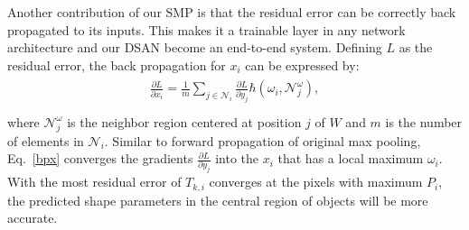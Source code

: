 Another contribution of our SMP is that the residual error can be correctly back propagated to its inputs.
This makes it a trainable layer in any network architecture and our DSAN become an end-to-end system.
Defining $L$ as the residual error, the back propagation for $x_{i}$ can be expressed by:
\begin{eqnarray}\label{bpx}
\begin{aligned}
\frac{\partial L}{\partial x_{i}}=\frac{1}{m}\sum\limits_{j\in\mathcal{N}_{i}}\frac{\partial L}{\partial y_{j}}\hbar(\omega_{i},{\mathcal{N}}^{\omega}_{j}),\\
\end{aligned}
\end{eqnarray}
%
where $\mathcal{N}^{\omega}_{j}$ is the neighbor region centered at position $j$ of $W$ and $m$ is the number of elements in $\mathcal{N}_{i}$.
Similar to forward propagation of original max pooling, Eq.~\ref{bpx} converges the gradients $\frac{\partial L}{\partial y_{j}}$ into the $x_{i}$ that has a local maximum $\omega_{i}$.
With the most residual error of $T_{k,i}$ converges at the pixels with maximum $P_i$, the predicted shape parameters in the central region of objects will be more accurate.


